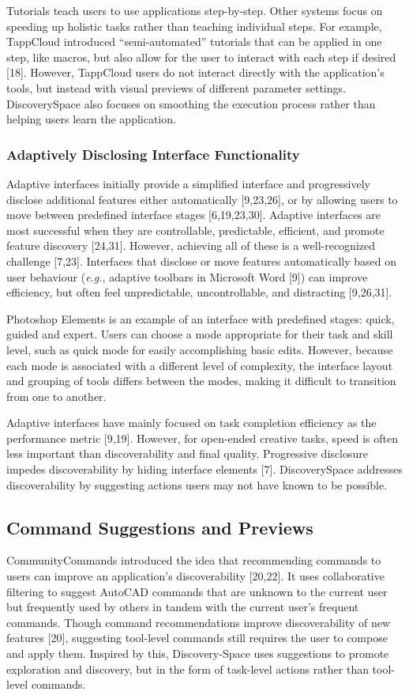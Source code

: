 Tutorials teach users to use applications step-by-step. Other systems focus on speeding up holistic tasks rather than teaching individual steps. For example, TappCloud introduced ``semi-automated'' tutorials that can be applied in one step, like macros, but also allow for the user to interact with each step if desired [18]. However, TappCloud users do not interact directly with the application's tools, but instead with visual previews of different parameter settings. Discovery\-Space also focuses on smoothing the execution process rather than helping users learn the application.

\subsubsection{Adaptively Disclosing Interface Functionality}
Adaptive interfaces initially provide a simplified interface and progressively disclose additional features either automatically [9,23,26], or by allowing users to move between predefined interface stages [6,19,23,30]. Adaptive interfaces are most successful when they are controllable, predictable, efficient, and promote feature discovery [24,31]. However, achieving all of these is a well-recognized challenge [7,23]. Interfaces that disclose or move features automatically based on user behaviour (\textit{e.g.}, adaptive toolbars in Microsoft Word [9]) can improve efficiency, but often feel unpredictable, uncontrollable, and distracting [9,26,31].

Photoshop Elements is an example of an interface with predefined stages: quick, guided and expert. Users can choose a mode appropriate for their task and skill level, such as quick mode for easily accomplishing basic edits. However, because each mode is associated with a different level of complexity, the interface layout and grouping of tools differs between the modes, making it difficult to transition from one to another.

Adaptive interfaces have mainly focused on task completion efficiency as the performance metric [9,19]. However, for open-ended creative tasks, speed is often less important than discoverability and final quality. Progressive disclosure impedes discoverability by hiding interface elements [7]. Discovery\-Space addresses discoverability by suggesting actions users may not have known to be possible.

\subsection{Command Suggestions and Previews}
CommunityCommands introduced the idea that recommending commands to users can improve an application's discoverability [20,22]. It uses collaborative filtering to suggest AutoCAD commands that are unknown to the current user but frequently used by others in tandem with the current user's frequent commands. Though command recommendations improve discoverability of new features [20], suggesting tool-level commands still requires the user to compose and apply them. Inspired by this, Discovery-Space uses suggestions to promote exploration and discovery, but in the form of task-level actions rather than tool-level commands. 

